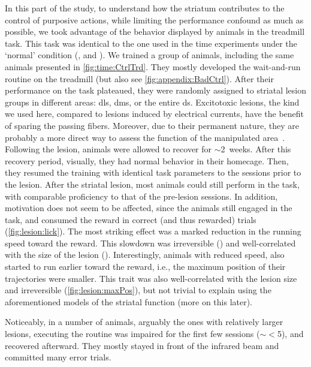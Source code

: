 \par
In this part of the study, to understand how the striatum contributes to the control of purposive actions, while limiting the performance confound as much as possible, we took advantage of the behavior displayed by animals in the treadmill task.
This task was identical to the one used in the time experiments under the `normal' condition (, and ).
We trained a group of animals, including the same animals presented in \autoref{fig:time:CtrlTrd}.
They mostly developed the wait-and-run routine on the treadmill (but also see \autoref{fig:appendix:BadCtrl}).
After their performance on the task plateaued, they were randomly assigned to striatal lesion groups in different areas:
    \gls{dls}, \gls{dms}, or the entire \gls{ds}.
Excitotoxic lesions, the kind we used here, compared to lesions induced by electrical currents, have the benefit of sparing the passing fibers.
Moreover, due to their permanent nature, they are probably a more direct way to assess the function of the manipulated area~\cite{Otchy2015Nature}.
Following the lesion, animals were allowed to recover for $\sim$2~weeks.
After this recovery period, visually, they had normal behavior in their homecage.
Then, they resumed the training with identical task parameters to the sessions prior to the lesion.
After the striatal lesion, most animals could still perform in the task, with comparable proficiency to that of the pre-lesion sessions.
In addition, motivation does not seem to be affected, since the animals still engaged in the task, and consumed the reward in correct (and thus rewarded) trials (\autoref{fig:lesion:lick}).
The most striking effect was a marked reduction in the running speed toward the reward.
This slowdown was irreversible () and well-correlated with the size of the lesion ().
Interestingly, animals with reduced speed, also started to run earlier toward the reward, i.e., the maximum position of their trajectories were smaller.
This trait was also well-correlated with the lesion size and irreversible (\autoref{fig:lesion:maxPos}), but not trivial to explain using the aforementioned models of the striatal function (more on this later).
\par
Noticeably, in a number of animals, arguably the ones with relatively larger lesions, executing the routine was impaired for the first few sessions ($\sim<$5), and recovered afterward.
They mostly stayed in front of the infrared beam and committed many error trials.
